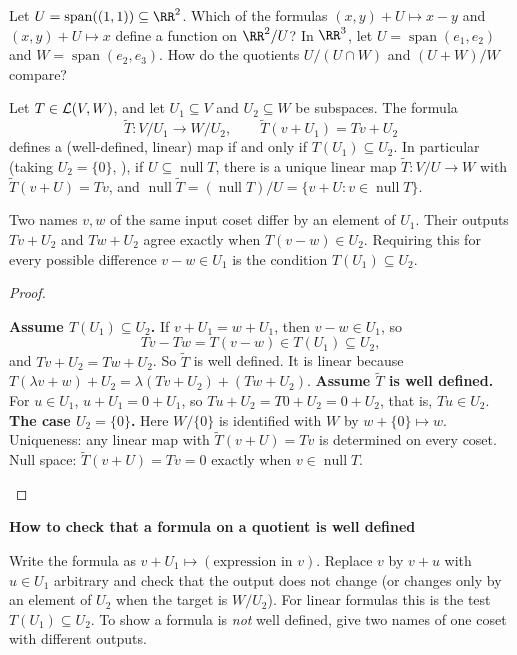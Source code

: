 \documentclass[10pt]{scrartcl}
\DeclareMathOperator{\spn}{span}\DeclareMathOperator{\nul}{null}\DeclareMathOperator{\range}{range}
\newcommand{\Tt}{\widetilde T}
\newenvironment{methodbox}[1]{\begin{mdframed}[style=methodstyle]\textbf{\color{NavyBlue}#1}\par\vspace{2pt}}{\end{mdframed}}
\begin{document}
\begin{qbox}
  Let $U=\spn((1,1))\subseteq\RR^2$. Which of the formulas $(x,y)+U\mapsto x-y$ and $(x,y)+U\mapsto x$ define a function on $\RR^2/U$? In $\RR^3$, let $U=\spn(e_1,e_2)$ and $W=\spn(e_2,e_3)$. How do the quotients $U/(U\cap W)$ and $(U+W)/W$ compare?
\end{qbox}

\begin{proposition*}
  Let $T\in\mathcal L(V,W)$, and let $U_1\subseteq V$ and $U_2\subseteq W$ be subspaces. The formula
  \[
    \Tt\colon V/U_1\to W/U_2, \qquad \Tt(v+U_1) = Tv + U_2
  \]
  defines a (well-defined, linear) map if and only if $T(U_1)\subseteq U_2$. In particular (taking $U_2=\{0\}$, ), if $U\subseteq\nul T$, there is a unique linear map $\Tt\colon V/U\to W$ with $\Tt(v+U)=Tv$, and $\nul\Tt=(\nul T)/U=\{v+U:v\in\nul T\}$.
\end{proposition*}
\begin{ideabox}
  Two names $v,w$ of the same input coset differ by an element of $U_1$. Their outputs $Tv+U_2$ and $Tw+U_2$ agree exactly when $T(v-w)\in U_2$. Requiring this for every possible difference $v-w\in U_1$ is the condition $T(U_1)\subseteq U_2$.
\end{ideabox}
\begin{proof}
  \begin{steps}
    \ii \textbf{Assume $T(U_1)\subseteq U_2$.} If $v+U_1=w+U_1$, then $v-w\in U_1$, so
    \[
      Tv-Tw=T(v-w)\in T(U_1)\subseteq U_2,
    \]
    and $Tv+U_2=Tw+U_2$. So $\Tt$ is well defined. It is linear because $T(\lambda v+w)+U_2=\lambda(Tv+U_2)+(Tw+U_2)$.
    \ii \textbf{Assume $\Tt$ is well defined.} For $u\in U_1$, $u+U_1=0+U_1$, so $Tu+U_2=T0+U_2=0+U_2$, that is, $Tu\in U_2$.
    \ii \textbf{The case $U_2=\{0\}$.} Here $W/\{0\}$ is identified with $W$ by $w+\{0\}\mapsto w$. Uniqueness: any linear map with $\Tt(v+U)=Tv$ is determined on every coset. Null space: $\Tt(v+U)=Tv=0$ exactly when $v\in\nul T$.
  \end{steps}
\end{proof}

\begin{methodbox}{How to check that a formula on a quotient is well defined}
  \begin{steps}
    \ii Write the formula as $v+U_1\mapsto(\text{expression in }v)$.
    \ii Replace $v$ by $v+u$ with $u\in U_1$ arbitrary and check that the output does not change (or changes only by an element of $U_2$ when the target is $W/U_2$). For linear formulas this is the test $T(U_1)\subseteq U_2$.
    \ii To show a formula is \emph{not} well defined, give two names of one coset with different outputs.
  \end{steps}
\end{methodbox}
\end{document}
